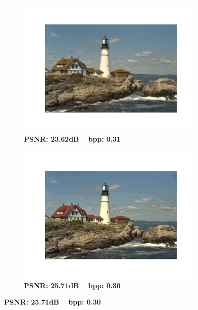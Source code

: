 \begin{figure}[t]
\begin{subfigure}{.23\textwidth}
	\end{subfigure}
	\begin{subfigure}{.23\textwidth}
		\centering
		\includegraphics[trim=1.7cm 1.5cm 1.7cm 1.7cm, clip, width=1\textwidth]{figures/kodim21_SVD_bpp_0.315.pdf}
		\vspace{-20pt}
		\caption*{\tiny \textbf{PSNR: 23.62dB ~ bpp: 0.31}}
	\end{subfigure}
	\begin{subfigure}{.23\textwidth}
		\centering
		\includegraphics[trim=1.7cm 1.5cm 1.7cm 1.7cm, clip, width=1\textwidth]{figures/kodim21_IMF_bpp_0.305.pdf}
		\vspace{-20pt}
		\caption*{\tiny \textbf{PSNR: 25.71dB ~ bpp: 0.30}}
	\end{subfigure}
	

\end{figure}
